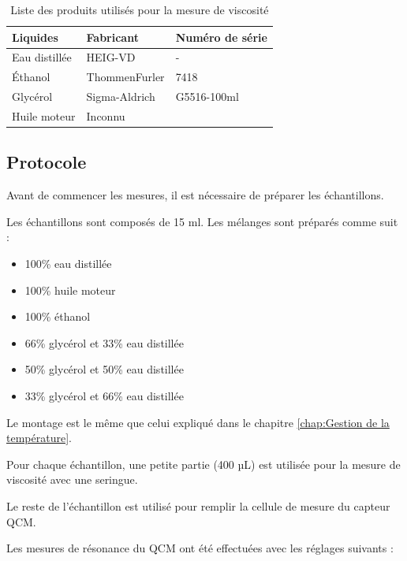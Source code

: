 \begin{table}[H]
    \centering
    \begin{tabular}{|l|l|l|}
        \hline
        \textbf{Liquides}       & \textbf{Fabricant}   & \textbf{Numéro de série} \\
        \hline
        Eau distillée           & HEIG-VD              & -           \\
        Éthanol                 & ThommenFurler        & 7418        \\
        Glycérol                & Sigma-Aldrich        & G5516-100ml \\
        Huile moteur            & Inconnu              &            \\
        \hline
    \end{tabular}
    \caption{Liste des produits utilisés pour la mesure de viscosité}
    
\end{table}

\subsection{Protocole}

Avant de commencer les mesures, il est nécessaire de préparer les échantillons.

Les échantillons sont composés de 15 ml. Les mélanges sont préparés comme suit :
\begin{itemize}[label=\textbullet]
    \item 100\% eau distillée
    \item 100\% huile moteur
    \item 100\% éthanol
    \item 66\% glycérol et 33\% eau distillée
    \item 50\% glycérol et 50\% eau distillée
    \item 33\% glycérol et 66\% eau distillée
\end{itemize}
Le montage est le même que celui expliqué dans le chapitre \ref{chap:Gestion de la température}.

Pour chaque échantillon, une petite partie (400 µL) est utilisée pour la mesure de viscosité avec une seringue.

Le reste de l'échantillon est utilisé pour remplir la cellule de mesure du capteur QCM.

Les mesures de résonance du QCM ont été effectuées avec les réglages suivants :

